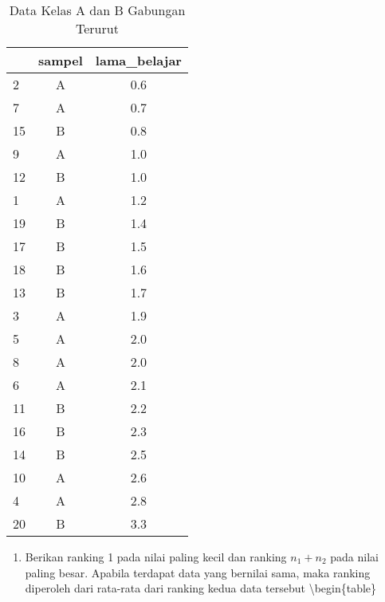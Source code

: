 \documentclass[
]{book}
\providecommand{\tightlist}{%
  \setlength{\itemsep}{0pt}\setlength{\parskip}{0pt}}
\begin{document}
\begin{table}

\caption{\label{tab:unnamed-chunk-12}Data Kelas A dan B Gabungan Terurut}
\centering
\begin{tabular}[t]{l|c|c}
\hline
  & sampel & lama\_belajar\\
\hline
2 & A & 0.6\\
\hline
7 & A & 0.7\\
\hline
15 & B & 0.8\\
\hline
9 & A & 1.0\\
\hline
12 & B & 1.0\\
\hline
1 & A & 1.2\\
\hline
19 & B & 1.4\\
\hline
17 & B & 1.5\\
\hline
18 & B & 1.6\\
\hline
13 & B & 1.7\\
\hline
3 & A & 1.9\\
\hline
5 & A & 2.0\\
\hline
8 & A & 2.0\\
\hline
6 & A & 2.1\\
\hline
11 & B & 2.2\\
\hline
16 & B & 2.3\\
\hline
14 & B & 2.5\\
\hline
10 & A & 2.6\\
\hline
4 & A & 2.8\\
\hline
20 & B & 3.3\\
\hline
\end{tabular}
\end{table}

\begin{enumerate}
\def\labelenumi{\arabic{enumi}.}
\setcounter{enumi}{1}
\tightlist
\item
  Berikan ranking 1 pada nilai paling kecil dan ranking \(n_1+n_2\) pada nilai paling besar. Apabila terdapat data yang bernilai sama, maka ranking diperoleh dari rata-rata dari ranking kedua data tersebut
  \textbackslash begin\{table\}
\end{enumerate}
\end{document}
